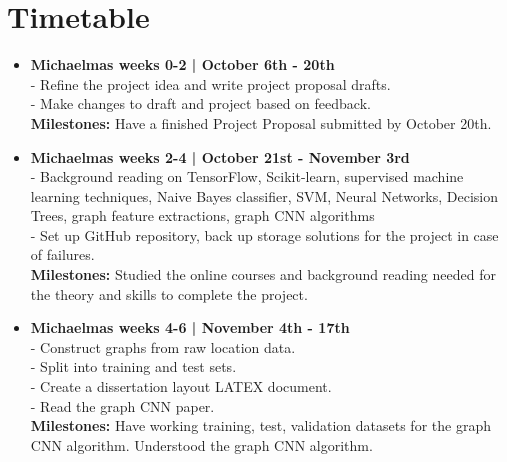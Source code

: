 \documentclass[12pt,a4paper,twoside]{article}
\begin{document}
\section*{Timetable}
\begin{itemize}
\item \textbf{Michaelmas weeks 0-2 | October 6th - 20th}\\
- Refine the project idea and write project proposal drafts.\\
- Make changes to draft and project based on feedback.\\
\textbf{Milestones:} Have a finished Project Proposal submitted by October 20th.
\item \textbf{Michaelmas weeks 2-4 | October 21st - November 3rd}\\
- Background reading on TensorFlow, Scikit-learn, supervised machine learning techniques, Naive Bayes classifier, SVM, Neural Networks, Decision Trees, graph feature extractions, graph CNN algorithms\\
- Set up GitHub repository, back up storage solutions for the project in case of failures.\\
\textbf{Milestones: }Studied the online courses\cite{MLcourse,udacity,coursera} and background reading needed for the theory and skills to complete the project. 
\item \textbf{Michaelmas weeks 4-6 | November 4th - 17th}\\
- Construct graphs from raw location data.\\
- Split into training and test sets.\\
- Create a dissertation layout LATEX document.\\
- Read the graph CNN paper\cite{CNN1}.\\
\textbf{Milestones: }Have working training, test, validation datasets for the graph CNN algorithm. Understood the graph CNN algorithm.\\



\end{itemize}
\end{document}
